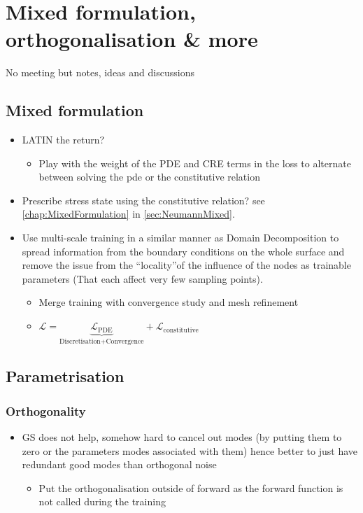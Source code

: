 \chapter[The 5$^{\text{th}}$ of April 2024 - Mixed formulation, orthogonalisation \& mor]{Mixed formulation, orthogonalisation \& more}


\begin{chapabstract}
	No meeting but notes, ideas and discussions
\end{chapabstract}


\minitoc

\section{Mixed formulation}

\begin{itemize}
	\item LATIN the return?
	\begin{itemize}
		\item Play with the weight of the PDE and CRE terms in the loss to alternate between solving the pde or the constitutive relation
	\end{itemize}
	\item Prescribe stress state using the constitutive relation? see \cref{chap:MixedFormulation} in \cref{sec:NeumannMixed}.
	\item Use multi-scale training in a similar manner as Domain Decomposition to spread information from the boundary conditions on the whole surface and remove the issue from the ``locality''of the influence of the nodes as trainable parameters (That each affect very few sampling points).
	\begin{itemize}
		\item Merge training with convergence study and mesh refinement 
		\item $\mathcal{L} =\underbrace{ \mathcal{L}_{\text{PDE}}}_{\text{Discretisation}+\text{Convergence}} + \mathcal{L}_{\text{constitutive}}$
	\end{itemize}
\end{itemize}

\section{Parametrisation}

\subsection{Orthogonality}
\begin{itemize}
	\item GS does not help, somehow hard to cancel out modes (by putting them to zero or the parameters modes associated with them) hence better to just have redundant good modes than orthogonal noise
	\begin{itemize}
		\item Put the orthogonalisation outside of forward as the forward function is not called during the training
	\end{itemize}
\end{itemize}

